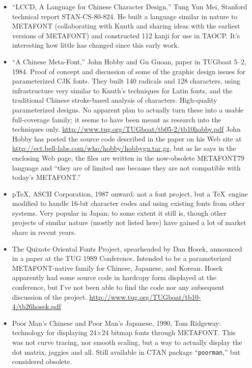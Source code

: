 \documentclass[14pt]{extarticle}
\begin{document}
\begin{itemize}

\item ``LCCD, A Language for Chinese Character Design,'' Tung Yun Mei,
Stanford technical report STAN-CS-80-824.  He built a language similar in
nature to METAFONT (collaborating with Knuth and sharing ideas with the
earliest versions of METAFONT) and constructed 112 kanji for use in TAOCP. 
It's interesting how little has changed since this early work.

\item ``A Chinese Meta-Font,'' John Hobby and Gu Guoan, paper in TUGboat
5--2, 1984.  Proof of concept and discussion of some of the graphic design
issues for parameterized CJK fonts.  They built 140 radicals and 128
characters, using infrastructure very similar to Knuth's techniques for
Latin fonts, and the traditional Chinese stroke-based analysis of
characters.  High-quality parameterized designs.  No apparent plan to
actually turn these into a usable full-coverage family; it seems to have
been meant as research into the techniques only. 
\url{http://www.tug.org/TUGboat/tb05-2/tb10hobby.pdf}  John Hobby has posted
the source code described in the paper on his Web site at
\url{http://ect.bell-labs.com/who/hobby/hobbygu.tar.gz}, but as he says in
the enclosing Web page, the files are written in the now-obsolete
METAFONT79 language and ``they are of limited use because they are not
compatible with today's METAFONT.''

\item p\TeX, ASCII Corporation, 1987 onward: not a font project, but a \TeX\
engine modified to handle 16-bit character codes and using existing fonts
from other systems.  Very popular in Japan; to some extent it still is,
though other projects of similar nature (mostly not listed here) have
gained a lot of market share in recent years.

\item The Quixote Oriental Fonts Project, spearheaded by Dan Hosek,
announced in a paper at the TUG 1989 Conference.  Intended to be a
parameterized METAFONT-native family for Chinese, Japanese, and Korean.
Hosek apparently had some source code in hardcopy form displayed at the
conference, but I've not been able to find the code nor any subsequent
discussion of the project.
\url{http://www.tug.org/TUGboat/tb10-4/tb26hosek.pdf}

\item Poor Man's Chinese and Poor Man's Japanese, 1990, Tom Ridgeway:
technology for displaying 24×24 bitmap fonts through METAFONT.  This
was not curve tracing, nor smooth scaling, but a way to actually display
the dot matrix, jaggies and all.  Still available in CTAN package
``\texttt{poorman},'' but considered obsolete.


\end{itemize}
\end{document}
